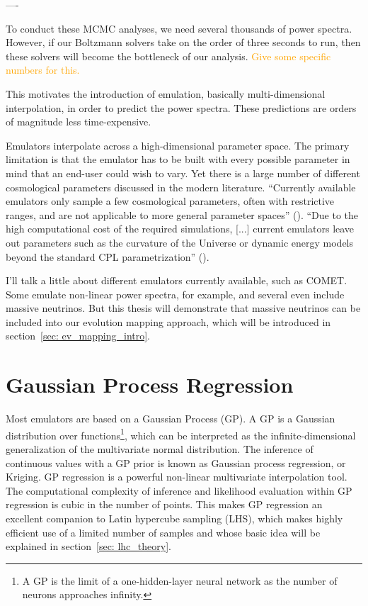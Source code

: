 ----

To conduct these MCMC analyses, we need several thousands of power spectra. However, if our Boltzmann solvers take on the order of three seconds to run, then these solvers will become the bottleneck of our analysis. \textcolor{orange}{Give some specific numbers for this.}

This motivates the introduction of emulation, basically multi-dimensional interpolation, in order to predict the power spectra. These predictions are orders of magnitude less time-expensive. 

Emulators interpolate across a high-dimensional parameter space. The primary
limitation is that the emulator has to be built with every possible parameter
in mind that an end-user could wish to vary. Yet there is a large number of
different cosmological parameters discussed in the modern literature.
``Currently available emulators only sample a few cosmological parameters,
often with restrictive ranges, and are not applicable to more general
parameter
spaces'' (). ``Due to the high computational cost of the required
simulations, [...] current emulators leave out parameters such as the
curvature
of the Universe or dynamic energy models beyond the standard CPL
parametrization'' ().

I'll talk a little about different emulators currently available, such as COMET. Some emulate non-linear power spectra, for example, and several even include massive neutrinos. But this thesis will demonstrate that massive neutrinos can be included into our evolution mapping approach, which will be introduced in section~\ref{sec: ev_mapping_intro}.


\section{Gaussian Process Regression}
\label{sec: gpr_intro}


Most emulators are based on a Gaussian Process (GP). A GP is a Gaussian
distribution over functions\footnote
{A GP is the limit of a one-hidden-layer neural network as the number of
neurons approaches infinity.}, which can be interpreted
as the infinite-dimensional generalization of the multivariate normal
distribution. The inference of continuous values with a GP prior
is known as Gaussian process regression, or Kriging. GP regression is a
powerful non-linear multivariate interpolation tool. The computational
complexity of inference and likelihood evaluation within GP regression is cubic
in the number of points. This makes GP regression an excellent companion to
Latin hypercube sampling (LHS), which makes highly efficient use of a limited 
number of samples and whose basic idea will be explained in section~\ref{sec:
lhc_theory}.

